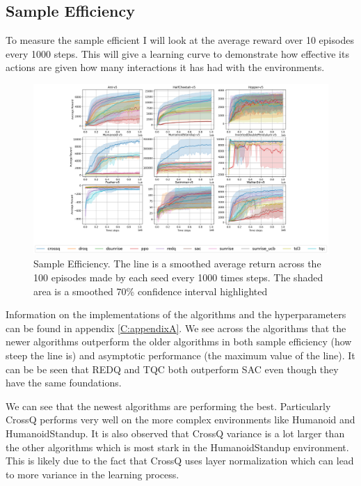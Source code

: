\subsection{Sample Efficiency}
To measure the sample efficient I will look at the average reward over 10 episodes every 1000 steps. This will give a learning curve to demonstrate how effective its actions are given how many interactions it has had with the environments.

\begin{figure}[H]
    \centering
    \includegraphics[width=1\textwidth]{figures/baseline_results.png}
    \caption{Sample Efficiency. The line is a smoothed average return across the 100 episodes made by each seed every 1000 times steps. The shaded area is a smoothed 70\% confidence interval highlighted }
    \label{fig:sample_efficiency}
\end{figure}

Information on the implementations of the algorithms and the hyperparameters can be found in appendix \ref{C:appendixA}. We see across the algorithms that the newer algorithms outperform the older algorithms in both sample efficiency (how steep the line is) and asymptotic performance (the maximum value of the line). It can be be seen that REDQ and TQC both outperform SAC even though they have the same foundations.

We can see that the newest algorithms are performing the best. Particularly CrossQ performs very well on the more complex environments like Humanoid and HumanoidStandup. It is also observed that CrossQ variance is a lot larger than the other algorithms which is most stark in the HumanoidStandup environment. This is likely due to the fact that CrossQ uses layer normalization which can lead to more variance in the learning process.

